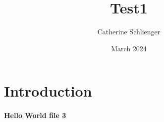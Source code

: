 \documentclass{article}
\title{Test1}
\author{Catherine Schlienger}
\date{March 2024}
\begin{document}
\maketitle

\section{Introduction}
\paragraph{Hello World file 3}
\end{document}
